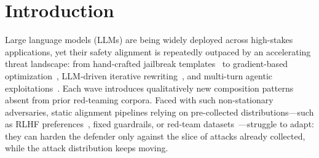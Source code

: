 \documentclass{article}
\begin{document}


\section{Introduction}
\label{sec:intro}

Large language models (LLMs) are being widely deployed across high-stakes applications, yet their safety alignment is repeatedly outpaced by an accelerating threat landscape: from hand-crafted jailbreak templates~\citep{shen2023doanythingnow} to gradient-based optimization~\citep{zou2023universal}, LLM-driven iterative rewriting~\citep{chao2023pair, mehrotra2024tap, liu2023autodan}, and multi-turn agentic exploitations~\citep{rahman2025xteaming, qi2025majic, samvelyan2024rainbow}. Each wave introduces qualitatively new composition patterns absent from prior red-teaming corpora. Faced with such non-stationary adversaries, static alignment pipelines relying on pre-collected distributions---such as RLHF preferences~\citep{ouyang2022training, bai2022constitutional, dai2023safe}, fixed guardrails, or red-team datasets~\citep{jiang2024wildteaming, xie2024sorry}---struggle to adapt: they can harden the defender only against the slice of attacks already collected, while the attack distribution keeps moving.
\end{document}
